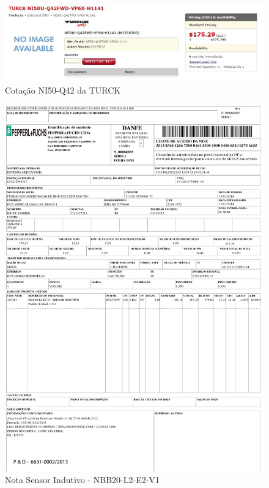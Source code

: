 \begin{figure}[h!]
 \centering
 \includegraphics[width=1\columnwidth]{Indutivo/price_quote_2}
 \caption{Cotação NI50-Q42 da TURCK }
\end{figure}

\begin{figure}[h!]
 \centering
 \includegraphics[width=1\columnwidth]{Indutivo/nota_indutivo.pdf}
 \caption{Nota Sensor Indutivo - NBB20-L2-E2-V1}
 \end{figure}